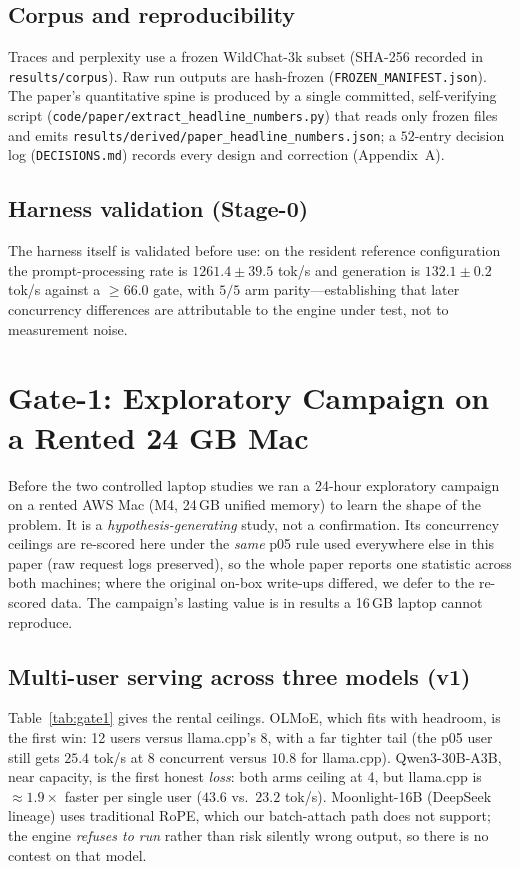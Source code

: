 \documentclass[11pt]{article}
\newcommand{\ppl}{\ensuremath{\times}}
\begin{document}
\subsection{Corpus and reproducibility}
Traces and perplexity use a frozen WildChat-3k subset (SHA-256 recorded in
\texttt{results/corpus}). Raw run outputs are hash-frozen (\texttt{FROZEN\_MANIFEST.json}).
The paper's quantitative spine is produced by a single committed, self-verifying script
(\texttt{code/paper/extract\_headline\_numbers.py}) that reads only frozen files and
emits \texttt{results/derived/paper\_headline\_numbers.json}; a $52$-entry decision log
(\texttt{DECISIONS.md}) records every design and correction (Appendix~A).

\subsection{Harness validation (Stage-0)}
The harness itself is validated before use: on the resident reference configuration the
prompt-processing rate is $1261.4\pm39.5$ tok/s and generation is $132.1\pm0.2$ tok/s
against a $\ge 66.0$ gate, with $5/5$ arm parity---establishing that later concurrency
differences are attributable to the engine under test, not to measurement noise.

\section{Gate-1: Exploratory Campaign on a Rented 24 GB Mac}
\label{sec:gate1}

Before the two controlled laptop studies we ran a 24-hour exploratory campaign on a
rented AWS Mac (M4, 24\,GB unified memory) to learn the shape of the problem. It is a
\emph{hypothesis-generating} study, not a confirmation. Its concurrency ceilings are
re-scored here under the \emph{same} p05 rule used everywhere else in this paper (raw
request logs preserved), so the whole paper reports one statistic across both machines;
where the original on-box write-ups differed, we defer to the re-scored data. The
campaign's lasting value is in results a 16\,GB laptop cannot reproduce.

\subsection{Multi-user serving across three models (v1)}
Table~\ref{tab:gate1} gives the rental ceilings. OLMoE, which fits with headroom, is the
first win: 12 users versus llama.cpp's 8, with a far tighter tail (the p05 user still
gets $25.4$ tok/s at 8 concurrent versus $10.8$ for llama.cpp). Qwen3-30B-A3B, near
capacity, is the first honest \emph{loss}: both arms ceiling at 4, but llama.cpp is
${\approx}1.9\ppl$ faster per single user ($43.6$ vs.\ $23.2$ tok/s). Moonlight-16B
(DeepSeek lineage) uses traditional RoPE, which our batch-attach path does not support;
the engine \emph{refuses to run} rather than risk silently wrong output, so there is no
contest on that model.
\end{document}
